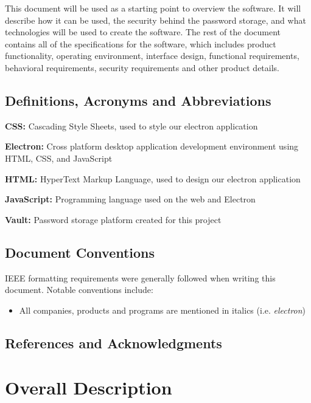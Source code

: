 \documentclass[11pt]{report}
\begin{document}
This document will be used as a starting point to overview the
software. It will describe how it can be used, the security behind the
password storage, and what technologies will be used to create the software.
The rest of the document contains all of the specifications for the
software, which includes product functionality, operating environment,
interface design, functional requirements, behavioral requirements, 
security requirements and other product details.


\section{Definitions, Acronyms and Abbreviations}
\textbf{CSS:} Cascading Style Sheets, used to style our electron application

\textbf{Electron:} Cross platform desktop application development environment
using HTML, CSS, and JavaScript

\textbf{HTML:} HyperText Markup Language, used to design our electron application

\textbf{JavaScript:} Programming language used on the web and Electron

\textbf{Vault:} Password storage platform created for this project


\section{Document Conventions}
IEEE formatting requirements were generally followed when writing this document.
Notable conventions include:

\begin{itemize}
    \item All companies, products and programs are mentioned in italics (i.e. \textit{electron})
    
\end{itemize}


\section{References and Acknowledgments}

    \nocite{*}
    \printbibliography[heading=none]



\chapter{Overall Description}
\end{document}
